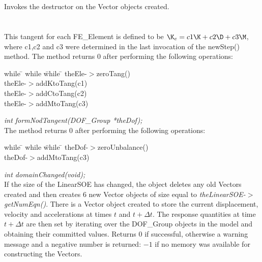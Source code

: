  \\
\\ 
Invokes the destructor on the Vector objects created. \\

\\
 \\
This tangent for each FE\_Element is defined to be $\K_e = c1 \K + c2
\D + c3 \M$, where c1,c2 and c3 were determined in the last invocation
of the newStep() method.  The method returns $0$ after
performing the following operations:
\begin{tabbing}
while \= \+ while \= while \= \kill
theEle-$>$zeroTang() \\
theEle-$>$addKtoTang(c1) \\
theEle-$>$addCtoTang(c2) \\
theEle-$>$addMtoTang(c3) 
\end{tabbing}


{\em int formNodTangent(DOF\_Group *theDof);} \\
The method returns $0$ after performing the following operations:
\begin{tabbing}
while \= \+ while \= while \= \kill
theDof-$>$zeroUnbalance() \\
theDof-$>$addMtoTang(c3) 
\end{tabbing}


{\em int domainChanged(void);}\\
If the size of the LinearSOE has changed, the object deletes any old Vectors
created and then creates $6$ new Vector objects of size equal to {\em
theLinearSOE-$>$getNumEqn()}. There is a Vector object created to store
the current displacement, velocity and accelerations at times $t$ and
$t + \Delta t$. The response quantities at time $t + \Delta t$ are
then set by iterating over the DOF\_Group objects in the model and
obtaining their committed values. 
Returns $0$ if successful, otherwise a warning message and a negative
number is returned: $-1$ if no memory was available for constructing
the Vectors. \\

